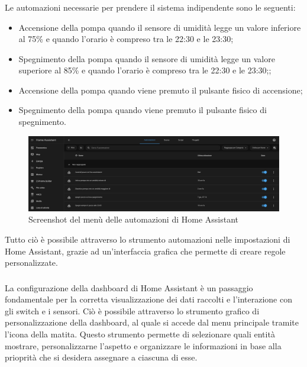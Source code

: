 \documentclass[11pt, a4paper]{article}
\begin{document}
\subsubsection{\quartaFaseHA}
Le automazioni necessarie per prendere il sistema indipendente sono le seguenti:
\begin{itemize}
    \item Accensione della pompa quando il sensore di umidità legge un valore inferiore al 75\% e quando l'orario
          è compreso tra le 22:30 e le 23:30;
    \item Spegnimento della pompa quando il sensore di umidità legge un valore superiore al 85\% e quando l'orario
          è compreso tra le 22:30 e le 23:30;;
    \item Accensione della pompa quando viene premuto il pulsante fisico di accensione;
    \item Spegnimento della pompa quando viene premuto il pulsante fisico di spegnimento.
\end{itemize}
\begin{figure}[H]
    
    \centering
    \includegraphics[width=1\textwidth]{media/screen-automazioni-homeassistant.png}
    \caption{Screenshot del menù delle automazioni di Home Assistant}
    \label{fig:automazioni-home-assistant}

\end{figure}
Tutto ciò è possibile attraverso lo strumento automazioni nelle impostazioni di Home Assistant, grazie ad
un'interfaccia grafica che permette di creare regole personalizzate.

\subsubsection{\quintaFaseHA}

La configurazione della dashboard di Home Assistant è un passaggio fondamentale per la corretta visualizzazione
dei dati raccolti e l'interazione con gli switch e i sensori.
Ciò è possibile attraverso lo strumento grafico di personalizzazione della dashboard, al quale si accede
dal menu principale tramite l'icona della matita. Questo strumento permette di selezionare quali entità
mostrare, personalizzarne l'aspetto e organizzare le informazioni in base alla prioprità che
si desidera assegnare a ciascuna di esse.
\end{document}
